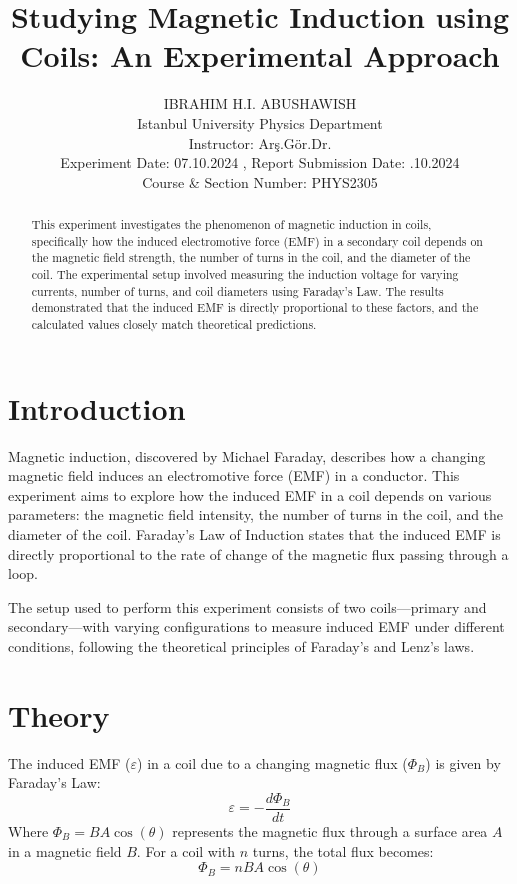 \documentclass[journal]{IEEEtran}
\begin{document}
\title{Studying Magnetic Induction using Coils: An Experimental Approach}
\author{IBRAHIM H.I. ABUSHAWISH\\
Istanbul University Physics Department\\
Instructor: Arş.Gör.Dr. \\
Experiment Date: 07.10.2024 , Report Submission Date:  .10.2024\\
Course \& Section Number: PHYS2305}

\maketitle

\begin{abstract}
    This experiment investigates the phenomenon of magnetic induction in coils, specifically how the induced electromotive force (EMF) in a secondary coil depends on the magnetic field strength, the number of turns in the coil, and the diameter of the coil. The experimental setup involved measuring the induction voltage for varying currents, number of turns, and coil diameters using Faraday's Law. The results demonstrated that the induced EMF is directly proportional to these factors, and the calculated values closely match theoretical predictions.
\end{abstract}

\section{Introduction}
Magnetic induction, discovered by Michael Faraday, describes how a changing magnetic field induces an electromotive force (EMF) in a conductor. This experiment aims to explore how the induced EMF in a coil depends on various parameters: the magnetic field intensity, the number of turns in the coil, and the diameter of the coil. Faraday’s Law of Induction states that the induced EMF is directly proportional to the rate of change of the magnetic flux passing through a loop.

The setup used to perform this experiment consists of two coils—primary and secondary—with varying configurations to measure induced EMF under different conditions, following the theoretical principles of Faraday's and Lenz's laws.

\section{Theory}
The induced EMF (\(\varepsilon\)) in a coil due to a changing magnetic flux (\(\Phi_B\)) is given by Faraday’s Law:
\begin{equation}
    \varepsilon = - \frac{d\Phi_B}{dt}
\end{equation}
Where \(\Phi_B = B A \cos(\theta)\) represents the magnetic flux through a surface area \(A\) in a magnetic field \(B\). For a coil with \(n\) turns, the total flux becomes:
\begin{equation}
    \Phi_B = n B A \cos(\theta)
\end{equation}
\end{document}
